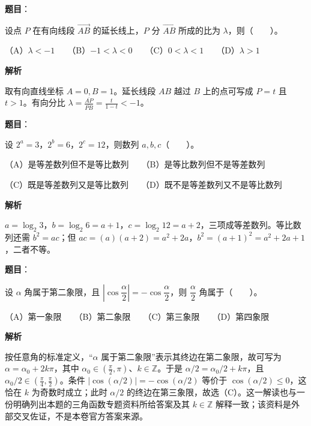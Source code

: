 \begin{answer}

\textbf{题目}：

设点 $P$ 在有向线段 $\overrightarrow{AB}$ 的延长线上，$P$ 分 $\overrightarrow{AB}$ 所成的比为 $\lambda$，则\mbox{（　　）}。

（A）$\lambda<-1$　　（B）$-1<\lambda<0$　　（C）$0<\lambda<1$　　（D）$\lambda>1$

\textbf{解析}

取有向直线坐标 $A=0,B=1$。延长线段 $AB$ 越过 $B$ 上的点可写成 $P=t$ 且 $t>1$。有向分比 $\lambda=\frac{\overline{AP}}{\overline{PB}}=\frac{t}{1-t}<-1$。


\end{answer}
\begin{answer}

\textbf{题目}：

设 $2^a=3$，$2^b=6$，$2^c=12$，则数列 $a,b,c$\mbox{（　　）}。

（A）是等差数列但不是等比数列　　（B）是等比数列但不是等差数列

（C）既是等差数列又是等比数列　　（D）既不是等差数列又不是等比数列

\textbf{解析}

$a=\log_2 3$，$b=\log_2 6=a+1$，$c=\log_2 12=a+2$，三项成等差数列。等比数列还需 $b^2=ac$；但 $ac=(a)(a+2)=a^2+2a$，$b^2=(a+1)^2=a^2+2a+1$，二者不等。


\end{answer}
\begin{answer}

\textbf{题目}：

设 $\alpha$ 角属于第二象限，且 $\left|\cos\dfrac\alpha2\right|=-\cos\dfrac\alpha2$，则 $\dfrac\alpha2$ 角属于\mbox{（　　）}。

（A）第一象限　　（B）第二象限　　（C）第三象限　　（D）第四象限

\textbf{解析}

按任意角的标准定义，“$\alpha$ 属于第二象限”表示其终边在第二象限，故可写为 $\alpha=\alpha_0+2k\pi$，其中 $\alpha_0\in(\frac\pi2,\pi)$、$k\in\mathbb Z$。于是 $\alpha/2=\alpha_0/2+k\pi$，且 $\alpha_0/2\in(\frac\pi4,\frac\pi2)$。条件 $|\cos(\alpha/2)|=-\cos(\alpha/2)$ 等价于 $\cos(\alpha/2)\le0$，这恰在 $k$ 为奇数时成立；此时 $\alpha/2$ 的终边在第三象限，故选（C）。这一解读也与一份明确列出本题的三角函数专题资料所给答案及其 $k\in\mathbb Z$ 解释一致；该资料是外部交叉佐证，不是本卷官方答案来源。


\end{answer}
